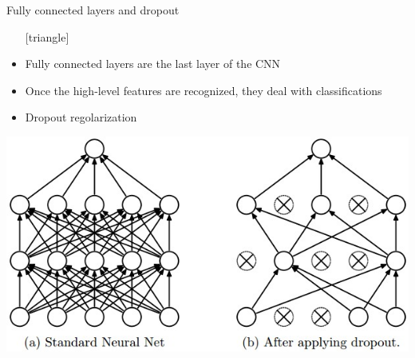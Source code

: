 \documentclass{beamer}
\begin{document}
\begin{frame}{Fully connected layers and dropout}
	\begin{itemize}
		\setlength\itemsep{1em}
		[triangle]
		\item 
			Fully connected layers are the last layer of the CNN
		\item 
			Once the high-level features are recognized, they deal with classifications
		\item
			Dropout regolarization
	\end{itemize}
	\begin{center}
		\includegraphics[scale=0.35]{dropout}
	\end{center}
\end{frame}
\end{document}
